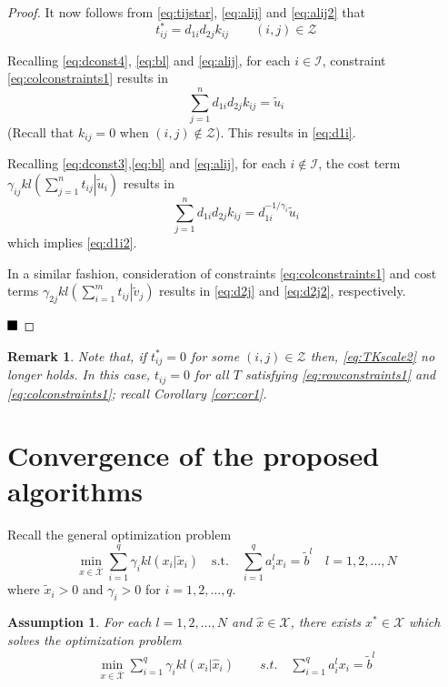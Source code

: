 \documentclass[twocolumn]{article}
\newtheorem{assumption}{Assumption}
\newtheorem{remark}{Remark}
\def\qed{ \rule{.1in}{.1in}}
\begin{document}
\begin{proof}
It now follows from \eqref{eq:tijstar}, \eqref{eq:alij} and \eqref{eq:alij2} that
\[
t^*_{ij} = d_{1i}d_{2j} k_{ij} \qquad (i, j) \in \mathcal{Z}
\]


Recalling \eqref{eq:dconst4}, \eqref{eq:bl} and \eqref{eq:alij}, for each  $i \in \mathcal{I}$, constraint \eqref{eq:colconstraints1} results in
\[
\sum_{j=1}^n d_{1i}d_{2j}k_{ij} =\tilde{u}_i
\]
(Recall that $k_{ij} =0$ when $(i,j)\notin \mathcal{Z}$).
This 
 results in 
\eqref{eq:d1i}.

Recalling \eqref{eq:dconst3},\eqref{eq:bl} and \eqref{eq:alij}, for each  $i \notin \mathcal{I}$, 
the cost term $
\gamma_{ij} kl\left(\left. \sum_{j=1}^n  t_{ij} \right| \tilde{u}_i\right) $
results in
\[
\sum_{j=1}^n d_{1i}d_{2j}k_{ij} =d_{1i}^{-1/\gamma_i}\tilde{u}_i
\]
which implies 
\eqref{eq:d1i2}.

In a similar fashion, consideration of constraints \eqref{eq:colconstraints1} and cost terms $\gamma_{2j} kl\left(\left. \sum_{i=1}^m  t_{ij} \right| \tilde{v}_j\right) $
results in 
\eqref{eq:d2j} and \eqref{eq:d2j2}, respectively.

\hfill
$\qed$
\end{proof}

\begin{remark}
Note that, if $t^*_{ij} = 0$ for some  $(i, j) \in \mathcal{Z}$ then, 
\eqref{eq:TKscale2} no longer holds.
In this case, $t_{ij} = 0$ for all $T$ satisfying  
\eqref{eq:rowconstraints1} and  \eqref{eq:colconstraints1}; 
recall Corollary \ref{cor:cor1}.
\end{remark}



\section{Convergence of the proposed algorithms}
\label{sec:Proof}


Recall the general optimization problem
\begin{equation}
\label{eq:opt0}
\min_{x \in \bar{\mathcal X}}
\sum_{i=1}^q \gamma_i kl(x_i|\tilde{x}_i)
\quad \mbox{s.t.} \quad 
\sum_{i=1}^q a^l_{i}x _i= \tilde{b}^l \quad l =1, 2, \dots, N
\end{equation}
where $\tilde{x}_i >0$ and $\gamma_i >0$ for $i=1,2, \dots, q$.


\begin{assumption}
\label{ass1}
For each 
$l=1,2,\dots, N$ and $\hat{x}\in\mathcal{X}$,  there exists  
$x^*\in \mathcal{X}$
which solves the optimization problem
\begin{align}
\label{eq:opt0l}
\min_{x \in \bar{\mathcal X} } \sum_{i=1}^q \gamma_i kl(x_i|\hat{x}_i) \qquad s.t.\quad  \sum_{i=1}^q a^l_{i}x _i= \tilde{b}^l 
\end{align}
\end{assumption}
\end{document}
